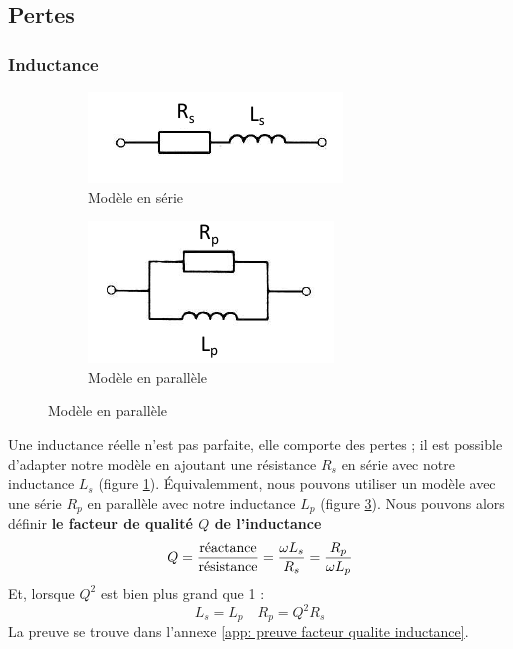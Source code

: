 \documentclass[12pt,a4paper]{article}
\begin{document}
\subsection{Pertes}
\label{subsection: phaseur pertes}
\subsubsection{Inductance}
\begin{figure}
	\centering
	\begin{subfigure}[b]{0.45\textwidth}
		\centering
		\includegraphics[scale=0.7]{images/inductance_serie}
		\caption{Modèle en série}
		\label{subfig: inductance_serie}
	\end{subfigure}
	\begin{subfigure}[b]{0.45\textwidth}
		\centering
		\includegraphics[scale=0.7]{images/inductance_parallele}
		\caption{Modèle en parallèle}
		\label{subfig: inductance_parallele}
	\end{subfigure}
\end{figure}
Une inductance réelle n'est pas parfaite, elle comporte des pertes ; il est possible d'adapter notre modèle en ajoutant une résistance $R_s$ en série avec notre inductance $L_s$ (figure \ref{subfig: inductance_serie}). Équivalemment, nous pouvons utiliser un modèle avec une série $R_p$ en parallèle avec notre inductance $L_p$ (figure \ref{subfig: inductance_parallele}). Nous pouvons alors définir \textbf{le facteur de qualité $Q$ de l'inductance}
\begin{equation}
	Q = \frac{\text{réactance}}{\text{résistance}} = \frac{\omega L_s}{R_s} = \frac{R_p}{\omega L_p}
\end{equation}
Et, lorsque $Q^2$ est bien plus grand que 1 :
\begin{equation}
L_s = L_p\quad R_p = Q^2R_s
\end{equation}
La preuve se trouve dans l'annexe \ref{app: preuve facteur qualite inductance}.
\end{document}
